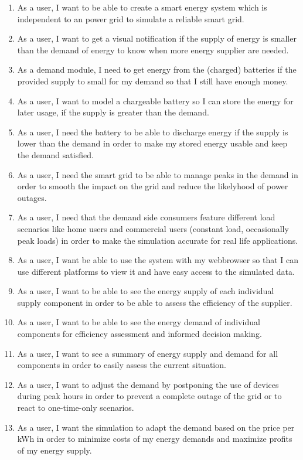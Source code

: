 \begin{enumerate}
\item As a user, I want to be able to create a smart energy system which is independent to an power grid to simulate a reliable smart grid.

\item As a user, I want to get a visual notification if the supply of energy is smaller than the demand of energy to know when more energy supplier are needed.

\item As a demand module, I need to get energy from the (charged) batteries if the provided supply to small for my demand so that I still have enough money. 

\item As a user, I want to model a chargeable battery so I can store the energy for later usage, if the supply is greater than the demand.

\item As a user, I need the battery to be able to discharge energy if the supply is lower than the demand in order to make my stored energy usable and keep the demand satisfied.

\item As a user, I need the smart grid to be able to manage peaks in the demand in order to smooth the impact on the grid and reduce the likelyhood of power outages.

\item As a user, I need that the demand side consumers feature different load scenarios like home users and commercial users (constant load, occasionally peak loads) in order to make the simulation accurate for real life applications.

\item As a user, I want be able to use the system with my webbrowser so that I can use different platforms to view it and have easy access to the simulated data.

\item As a user, I want to be able to see the energy supply of each individual supply component in order to be able to assess the efficiency of the supplier.

\item As a user, I want to be able to see the energy demand of individual components for efficiency assessment and informed decision making. 

\item As a user, I want to see a summary of energy supply and demand for all components in order to easily assess the current situation.

\item As a user, I want to adjust the demand by postponing the use of devices during peak hours in order to prevent a complete outage of the grid or to react to one-time-only scenarios.

\item As a user, I want the simulation to adapt the demand based on the price per kWh in order to minimize costs of my energy demands and maximize profits of my energy supply.



\end{enumerate}
